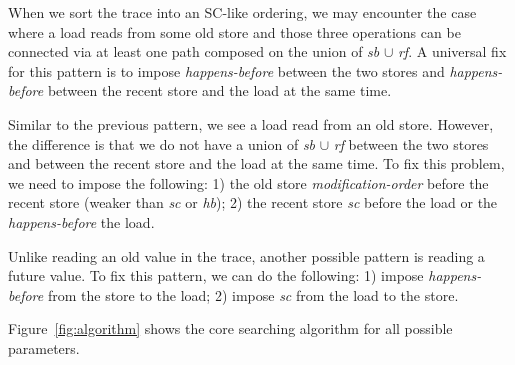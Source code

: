  When we sort the trace into an SC-like
ordering, we may encounter the case where a load reads from some old store
and those three operations can be connected via at least one path composed on
the union of \textit{sb} $\cup$ \textit{rf}. A universal fix for this pattern is
to impose \textit{happens-before} between the two stores and
\textit{happens-before} between the recent store and the load at the same time.

 Similar to the previous pattern, we see a
load read from an old store. However, the difference is that we do not have a
union of \textit{sb} $\cup$ \textit{rf} between the two stores and between the
recent store and the load at the same time. To fix this problem, we need to
impose the following: 1) the old store \textit{modification-order} before the
recent store (weaker than \textit{sc} or \textit{hb}); 2) the recent store
\textit{sc} before the load or the \textit{happens-before} the load.


 Unlike reading an old value in the trace,
another possible pattern is reading a future value. To fix this pattern, we can
do the following: 1) impose \textit{happens-before} from the store to the load;
2) impose \textit{sc} from the load to the store.


Figure~\ref{fig:algorithm} shows the core searching algorithm for all possible
parameters.


